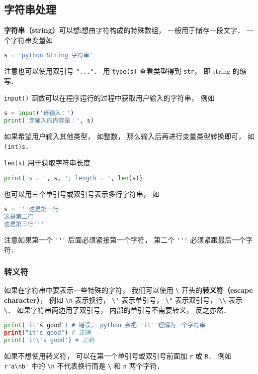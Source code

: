 

\subsection{字符串处理}
\textbf{字符串（string）}可以想i想由字符构成的特殊数组， 一般用于储存一段文字． 一个字符串变量如
\begin{lstlisting}[language=python]
s = 'python String 字符串'
\end{lstlisting}
注意也可以使用双引号 \verb|"..."|． 用 \verb|type(s)| 查看类型得到 \verb|str|， 即 string 的缩写．

\verb|input()| 函数可以在程序运行的过程中获取用户输入的字符串， 例如
\begin{lstlisting}[language=python]
s = input('请输入：')
print('您输入的内容是：', s)
\end{lstlisting}
如果希望用户输入其他类型， 如整数， 那么输入后再进行变量类型转换即可， 如 \verb|(int)s|．

\verb|len(s)| 用于获取字符串长度
\begin{lstlisting}[language=python]
print('s = ', s, '; length = ', len(s))
\end{lstlisting}
也可以用三个单引号或双引号表示多行字符串， 如
\begin{lstlisting}[language=python]
s = '''这是第一行
这是第二行
这是第三行'''
\end{lstlisting}
注意如果第一个 \verb|'''| 后面必须紧接第一个字符， 第二个 \verb|'''| 必须紧跟最后一个字符．

\subsubsection{转义符}
如果在字符串中要表示一些特殊的字符， 我们可以使用 \verb|\| 开头的\textbf{转义符（escape character）}， 例如 \verb|\n| 表示换行， \verb|\'| 表示单引号， \verb|\"| 表示双引号， \verb|\\| 表示 \verb|\|． 如果字符串两边用了双引号， 内部的单引号不需要转义， 反之亦然．
\begin{lstlisting}[language=python]
print('it's good') # 错误， python 会把 'it' 理解为一个字符串
print("it's good") # 正确
print('it\'s good') # 正确
\end{lstlisting}

如果不想使用转义符， 可以在第一个单引号或双引号前面加 \verb|r| 或 \verb|R|． 例如 \verb|r'a\nb'| 中的 \verb|\n| 不代表换行而是 \verb|\| 和 \verb|n| 两个字符．

